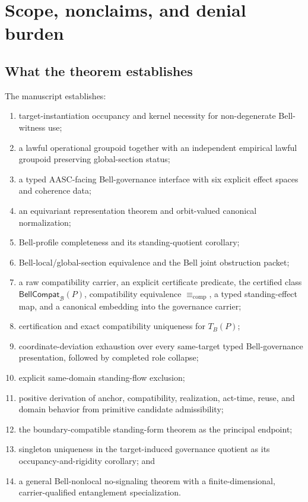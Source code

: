 \documentclass[11pt]{article}
\theoremstyle{definition}
\newcommand{\Bell}{\mathcal{B}}
\newcommand{\CompEq}{\equiv_{\mathrm{comp}}}
\newcommand{\BellCompat}{\mathsf{BellCompat}_{\Bell}(P)}
\begin{document}
\section{Scope, nonclaims, and denial burden}\label{sec:scope2}

\subsection{What the theorem establishes}
The manuscript establishes:
\begin{enumerate}[leftmargin=2em]
\item target-instantiation occupancy and kernel necessity for non-degenerate Bell-witness use;
\item a lawful operational groupoid together with an independent empirical lawful groupoid preserving global-section status;
\item a typed AASC-facing Bell-governance interface with six explicit effect spaces and coherence data;
\item an equivariant representation theorem and orbit-valued canonical normalization;
\item Bell-profile completeness and its standing-quotient corollary;
\item Bell-local/global-section equivalence and the Bell joint obstruction packet;
\item a raw compatibility carrier, an explicit certificate predicate, the certified class $\BellCompat$, compatibility equivalence $\CompEq$, a typed standing-effect map, and a canonical embedding into the governance carrier;
\item certification and exact compatibility uniqueness for $T_B(P)$;
\item coordinate-deviation exhaustion over every same-target typed Bell-governance presentation, followed by completed role collapse;
\item explicit same-domain standing-flow exclusion;
\item positive derivation of anchor, compatibility, realization, act-time, reuse, and domain behavior from primitive candidate admissibility;
\item the boundary-compatible standing-form theorem as the principal endpoint;
\item singleton uniqueness in the target-induced governance quotient as its occupancy-and-rigidity corollary; and
\item a general Bell-nonlocal no-signaling theorem with a finite-dimensional, carrier-qualified entanglement specialization.
\end{enumerate}
\end{document}
